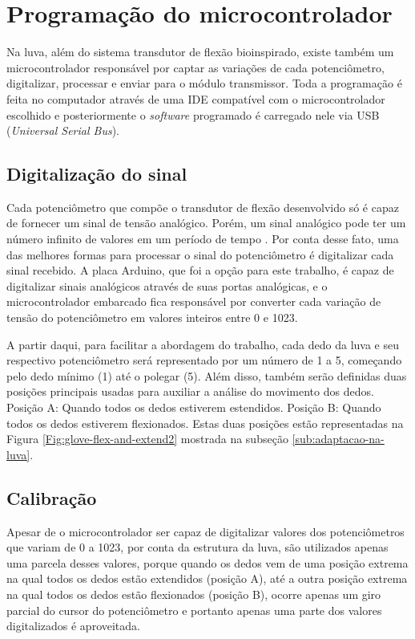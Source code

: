 \documentclass[
	12pt,				%
	openright,			%
	oneside,			%
	a4paper,			%
	english,			%
	brazil				%
	]{abntex2}
\begin{document}
	
		\section{Programação do microcontrolador}

		Na luva, além do sistema transdutor de flexão bioinspirado, existe também um microcontrolador responsável por captar as variações de cada potenciômetro, digitalizar, processar e enviar para o módulo transmissor. Toda a programação é feita no computador através de uma IDE compatível com o microcontrolador escolhido e posteriormente o \textit{software} programado é carregado nele via USB (\textit{Universal Serial Bus}).  
		
		\subsection{Digitalização do sinal}

		Cada potenciômetro que compõe o transdutor de flexão desenvolvido só é capaz de fornecer um sinal de tensão analógico. Porém, um sinal analógico pode ter um número infinito de valores em um período de tempo \cite{forouzan2009comunicacao}. Por conta desse fato, uma das melhores formas para processar o sinal do potenciômetro é digitalizar cada sinal recebido. A placa Arduino, que foi a opção para este trabalho, é capaz de digitalizar sinais analógicos através de suas portas analógicas, e o microcontrolador embarcado fica responsável por converter cada variação de tensão do potenciômetro em valores inteiros entre 0 e 1023. 

		A partir daqui, para facilitar a abordagem do trabalho, cada dedo da luva e seu respectivo potenciômetro será representado por um número de 1 a 5, começando pelo dedo mínimo (1) até o polegar (5). Além disso, também serão definidas duas posições principais usadas para auxiliar a análise do movimento dos dedos. Posição A: Quando todos os dedos estiverem estendidos. Posição B: Quando todos os dedos estiverem flexionados. Estas duas posições estão representadas na Figura \ref{Fig:glove-flex-and-extend2} mostrada na subseção \ref{sub:adaptacao-na-luva}.

				
		\subsection{Calibração}

		Apesar de o microcontrolador ser capaz de digitalizar valores dos potenciômetros que variam de 0 a 1023, por conta da estrutura da luva, são utilizados apenas uma parcela desses valores, porque quando os dedos vem de uma posição extrema na qual todos os dedos estão extendidos (posição A), até a outra posição extrema na qual todos os dedos estão flexionados (posição B), ocorre apenas um giro parcial do cursor do potenciômetro e portanto apenas uma parte dos valores digitalizados é aproveitada.
\end{document}
